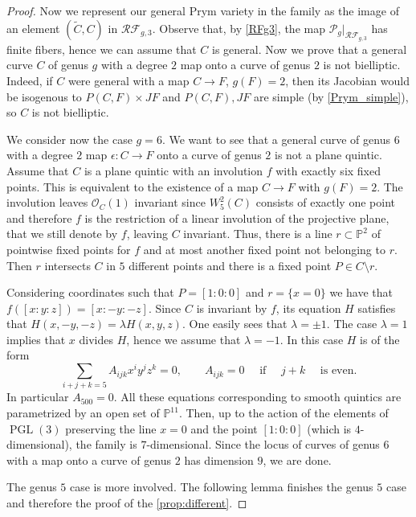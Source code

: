 \documentclass[preprint,12pt]{amsart}
\def\bP{\ensuremath{\mathbb{P}}}
\def\cF{\ensuremath{\mathcal{F}}}
\def\cO{\ensuremath{\mathcal{O}}}
\def\cP{\ensuremath{\mathcal{P}}}
\def\cR{\ensuremath{\mathcal{R}}}
\def\tC{\ensuremath{\tilde{C}}}
\theoremstyle{plain}
\theoremstyle{definition}
\begin{document}
\begin{proof}
Now we represent our general Prym variety in the family as the image of an element $(\tC,C)$ in $\mathcal {RF}_{g,3}$.
Observe that,  by \autoref{RFg3}, the map $\cP_g|_{\cR\cF_{g,3}}$ has finite fibers, hence we can assume that $C$ is general. Now we prove that a general curve $C$ of genus $g$ with a degree $2$ map onto a curve of genus $2$ is not bielliptic. 
Indeed, if $C$ were general with a map $C\rightarrow F$, $g(F)=2$, then its Jacobian would be isogenous to $P(C,F)\times JF$ and $P(C,F), JF$ are simple (by \autoref{Prym_simple}), so $C$ is not bielliptic.

We consider now the case $g=6$.
We want to see that a general curve of genus $6$ with a degree $2$ map $\epsilon : C\rightarrow F$ onto a curve of genus $2$ is not a plane quintic.
Assume that $C$ is a plane quintic with an involution $f$ with exactly six fixed points.
This is equivalent to the existence of a map $C\rightarrow F$ with $g(F)=2$.
The involution leaves $\cO_C(1)$ invariant since $W^2_5(C)$ consists of exactly one point 
and therefore $f$ is the restriction of a linear involution of the projective plane, that we still denote by $f$, leaving $C$ invariant.
Thus, there is a line $r\subset \bP^2$ of pointwise fixed points for $f$ and at most another fixed point not belonging to $r$.
Then $r$ intersects $C$ in $5$ different points and there is a fixed point $P\in C\setminus r$.

Considering coordinates such that $P=[1:0:0]$ and $r=\{x=0\}$ we have that $f([x:y:z])=[x:-y:-z]$.
Since $C$ is invariant by $f$, its equation $H$ satisfies that $H(x,-y,-z)=\lambda H(x,y,z)$.
One easily sees that $\lambda =\pm 1$.
The case $\lambda =1$ implies that $x$ divides $H$, hence we assume that $\lambda = -1$.
In this case $H$ is of the form
\begin{equation}\label{eq_quintic}
\sum_{i+j+k=5} A_{ijk}x^i y^j z^k=0,\quad \quad A_{ijk}=0 \quad \text{ if } \quad j+k \quad \text{ is even}.
\end{equation}
In particular $A_{500}=0$.
All these equations corresponding to smooth quintics are para\-metrized by an open set of $\mathbb P^{11}$.
Then, up to the action of the elements of $\operatorname{PGL}(3)$ preserving the line $x=0$ and the point $[1:0:0]$ (which is $4$-dimensional), the family is $7$-dimensional.
Since the locus of curves of genus $6$ with a map onto a curve of genus $2$ has dimension $9$, we are done.


The genus $5$ case is more involved. The following lemma finishes the genus $5$ case and therefore the proof of the \autoref{prop:different}.
\end{proof}
\end{document}
